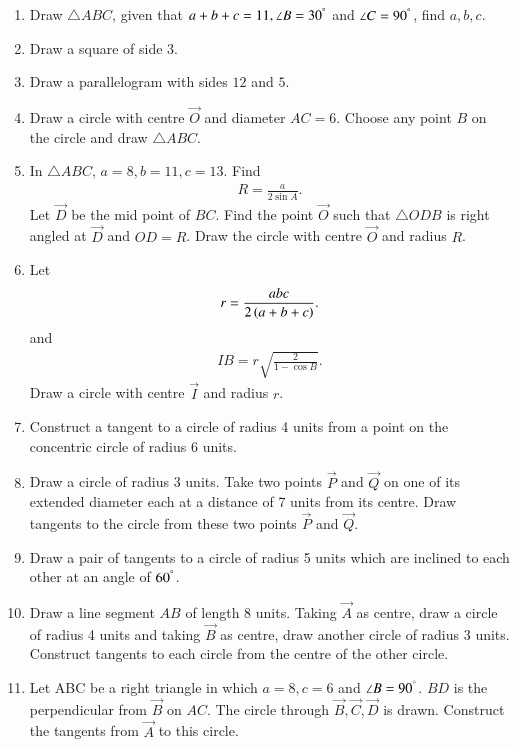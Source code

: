 \documentclass[journal,12pt,twocolumn]{IEEEtran}
\renewcommand\thesection{\arabic{section}}
\begin{document}
\begin{enumerate}[label=\thesection.\arabic*
,ref=\thesection.\theenumi]
Solving the equivalent matrix equation gives the desired answer.
\item Draw $\triangle ABC$,  given that $a+b+c = 11, \angle B = 30^{\degree}$ and $\angle C = 90^{\degree}$, 
find 
$a,b,c$.
\item Draw a square of side $3$.
\item Draw a parallelogram with sides $12$ and $5$.

\item Draw a circle with centre $\vec{O}$ and diameter $AC = 6$.  Choose any point $B$ on the circle and draw $\triangle ABC$.
\item In $\triangle ABC$, $a =8, b = 11, c = 13$. Find 
\begin{align}
R = \frac{a}{2\sin A}.
\end{align}
%
Let $\vec{D}$ be the mid point of $BC$.  Find the point $\vec{O}$ such that $\triangle ODB$ is right angled at $\vec{D}$ and $OD=R$. Draw the circle with centre $\vec{O}$ and radius $R$.
\item Let 
\begin{align}
r = \frac{abc}{2\left(a+b+c\right)}.
\end{align}
and 
\begin{align}
IB = r\sqrt{\frac{2}{1-\cos B}}.
\end{align}
%
Draw a circle with centre $\vec{I}$ and radius $r$.

\item Construct a tangent to a circle of radius 4 units from a point on the concentric circle of radius 6 
units.
\item Draw a circle of radius 3 units. Take  two points $\vec{P}$ and $\vec{Q}$ on one of its extended 
diameter each at a distance of 7 units from its centre. Draw tangents to the circle from these two points 
$\vec{P}$ and $\vec{Q}$.
\item Draw a pair of tangents to a circle of radius 5 units which are inclined to each other at an angle of 
$60^{\degree}$.
\item Draw a line segment $AB$ of length 8 units. Taking $\vec{A}$ as centre, draw a circle of radius 4 units 
and taking $\vec{B}$ as centre, draw another circle of radius 3 units. Construct tangents to each circle from 
the centre of the other circle.
\item Let ABC be a right triangle in which $a = 8, c = 6$ and $\angle B = 90^{\degree}$.  $BD$ is the 
perpendicular from $\vec{B}$ on $AC$. The circle through $\vec{B}, \vec{C}, \vec{D}$ is drawn.  Construct the 
tangents from $\vec{A}$ to this circle.
\end{enumerate}
\end{document}
